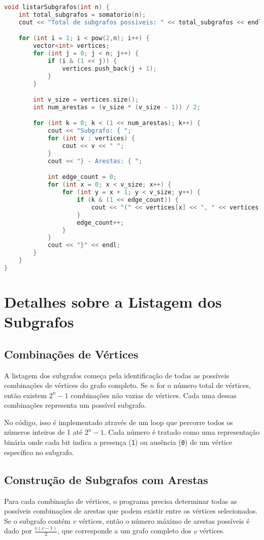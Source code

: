 \documentclass[a4paper,12pt]{article}
\begin{document}
\begin{lstlisting}[language=C++]
void listarSubgrafos(int n) {
    int total_subgrafos = somatorio(n);
    cout << "Total de subgrafos possiveis: " << total_subgrafos << endl;

    for (int i = 1; i < pow(2,n); i++) {
        vector<int> vertices;
        for (int j = 0; j < n; j++) {
            if (i & (1 << j)) {
                vertices.push_back(j + 1);
            }
        }

        int v_size = vertices.size();
        int num_arestas = (v_size * (v_size - 1)) / 2;

        for (int k = 0; k < (1 << num_arestas); k++) {
            cout << "Subgrafo: { ";
            for (int v : vertices) {
                cout << v << " ";
            }
            cout << "} - Arestas: { ";

            int edge_count = 0;
            for (int x = 0; x < v_size; x++) {
                for (int y = x + 1; y < v_size; y++) {
                    if (k & (1 << edge_count)) {
                        cout << "(" << vertices[x] << ", " << vertices[y] << ") ";
                    }
                    edge_count++;
                }
            }
            cout << "}" << endl;
        }
    }
}
\end{lstlisting}

\section{Detalhes sobre a Listagem dos Subgrafos}

\subsection{Combinações de Vértices}
A listagem dos subgrafos começa pela identificação de todas as possíveis combinações de vértices do grafo completo. Se \(n\) for o número total de vértices, então existem \(2^n - 1\) combinações não vazias de vértices. Cada uma dessas combinações representa um possível subgrafo.

No código, isso é implementado através de um loop que percorre todos os números inteiros de 1 até \(2^n - 1\). Cada número é tratado como uma representação binária onde cada bit indica a presença (\texttt{1}) ou ausência (\texttt{0}) de um vértice específico no subgrafo.

\subsection{Construção de Subgrafos com Arestas}
Para cada combinação de vértices, o programa precisa determinar todas as possíveis combinações de arestas que podem existir entre os vértices selecionados. Se o subgrafo contém \(v\) vértices, então o número máximo de arestas possíveis é dado por \( \frac{v(v-1)}{2} \), que corresponde a um grafo completo dos \(v\) vértices.
\end{document}
